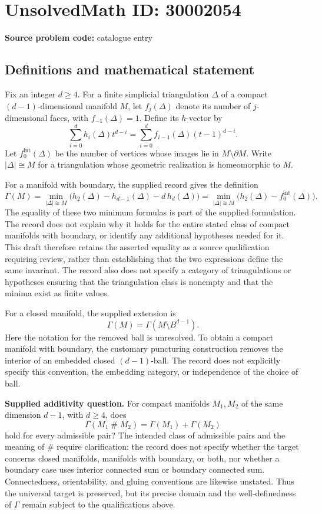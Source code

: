 \documentclass[11pt]{article}
\begin{document}
\section*{UnsolvedMath ID: 30002054}
\textbf{Source problem code:} catalogue entry
\subsection{Definitions and mathematical statement}
Fix an integer \(d\geq 4\). For a finite simplicial triangulation \(\Delta\) of a compact \((d-1)\)-dimensional manifold \(M\), let \(f_j(\Delta)\) denote its number of \(j\)-dimensional faces, with \(f_{-1}(\Delta)=1\). Define its \(h\)-vector by
\[
\sum_{i=0}^{d}h_i(\Delta)t^{d-i}
=\sum_{i=0}^{d}f_{i-1}(\Delta)(t-1)^{d-i}.
\]
Let \(f_0^{\mathrm{int}}(\Delta)\) be the number of vertices whose images lie in \(M\setminus\partial M\). Write \(|\Delta|\cong M\) for a triangulation whose geometric realization is homeomorphic to \(M\).

For a manifold with boundary, the supplied record gives the definition
\[
\Gamma(M)
=\min_{|\Delta|\cong M}
\bigl(h_2(\Delta)-h_{d-1}(\Delta)-d\,h_d(\Delta)\bigr)
=\min_{|\Delta|\cong M}
\bigl(h_2(\Delta)-f_0^{\mathrm{int}}(\Delta)\bigr).
\]
The equality of these two minimum formulas is part of the supplied formulation. The record does not explain why it holds for the entire stated class of compact manifolds with boundary, or identify any additional hypotheses needed for it. This draft therefore retains the asserted equality as a source qualification requiring review, rather than establishing that the two expressions define the same invariant. The record also does not specify a category of triangulations or hypotheses ensuring that the triangulation class is nonempty and that the minima exist as finite values.

For a closed manifold, the supplied extension is
\[
\Gamma(M)=\Gamma(M\setminus B^{d-1}).
\]
Here the notation for the removed ball is unresolved. To obtain a compact manifold with boundary, the customary puncturing construction removes the interior of an embedded closed \((d-1)\)-ball. The record does not explicitly specify this convention, the embedding category, or independence of the choice of ball.

\textbf{Supplied additivity question.} For compact manifolds \(M_1,M_2\) of the same dimension \(d-1\), with \(d\geq4\), does
\[
\Gamma(M_1\mathbin{\#}M_2)
=\Gamma(M_1)+\Gamma(M_2)
\]
hold for every admissible pair? The intended class of admissible pairs and the meaning of \(\#\) require clarification: the record does not specify whether the target concerns closed manifolds, manifolds with boundary, or both, nor whether a boundary case uses interior connected sum or boundary connected sum. Connectedness, orientability, and gluing conventions are likewise unstated. Thus the universal target is preserved, but its precise domain and the well-definedness of \(\Gamma\) remain subject to the qualifications above.
\end{document}
